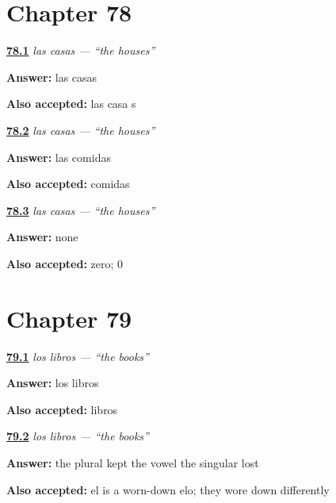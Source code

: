 \section*{Chapter 78}

\noindent\begin{minipage}[t]{\linewidth}
\raggedright
\hyperlink{review-ES-C44-las-houses}{\textbf{78.1}} \emph{las casas — \textquotedblleft{}the houses\textquotedblright{}}\par
\small \textbf{Answer:} las casas\par
\footnotesize \textbf{Also accepted:} las casa s
\end{minipage}\par\medskip

\noindent\begin{minipage}[t]{\linewidth}
\raggedright
\hyperlink{review-ES-C44-las-meals}{\textbf{78.2}} \emph{las casas — \textquotedblleft{}the houses\textquotedblright{}}\par
\small \textbf{Answer:} las comidas\par
\footnotesize \textbf{Also accepted:} comidas
\end{minipage}\par\medskip

\noindent\begin{minipage}[t]{\linewidth}
\raggedright
\hyperlink{review-ES-C44-las-rule}{\textbf{78.3}} \emph{las casas — \textquotedblleft{}the houses\textquotedblright{}}\par
\small \textbf{Answer:} none\par
\footnotesize \textbf{Also accepted:} zero; 0
\end{minipage}\par\medskip

\section*{Chapter 79}

\noindent\begin{minipage}[t]{\linewidth}
\raggedright
\hyperlink{review-ES-C44-los-books}{\textbf{79.1}} \emph{los libros — \textquotedblleft{}the books\textquotedblright{}}\par
\small \textbf{Answer:} los libros\par
\footnotesize \textbf{Also accepted:} libros
\end{minipage}\par\medskip

\noindent\begin{minipage}[t]{\linewidth}
\raggedright
\hyperlink{review-ES-C44-los-why}{\textbf{79.2}} \emph{los libros — \textquotedblleft{}the books\textquotedblright{}}\par
\small \textbf{Answer:} the plural kept the vowel the singular lost\par
\footnotesize \textbf{Also accepted:} el is a worn-down elo; they wore down differently
\end{minipage}\par\medskip

